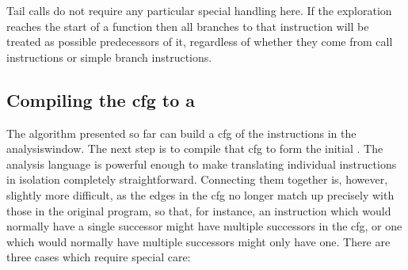 Tail calls do not require any particular special handling here.  If
the exploration reaches the start of a function then all branches to
that instruction will be treated as possible predecessors of it,
regardless of whether they come from call instructions or simple
branch instructions.

\subsection[Compiling the \glsentrytext{cfg} to a \StateMachine]{Compiling the \gls{cfg} to a \StateMachine}
\label{sect:derive:compile_cfg}

The algorithm presented so far can build a \gls{cfg} of the
instructions in the \gls{analysiswindow}.  The next step is to compile
that \gls{cfg} to form the initial {\StateMachine}.  The
{\StateMachine} analysis language is powerful enough to make
translating individual instructions in isolation completely
straightforward.  Connecting them together is, however, slightly more
difficult, as the edges in the \gls{cfg} no longer match up
precisely with those in the original program, so that, for instance,
an instruction which would normally have a single successor might have
multiple successors in the \gls{cfg}, or one which would normally
have multiple successors might only have one.  There are three cases
which require special care:

